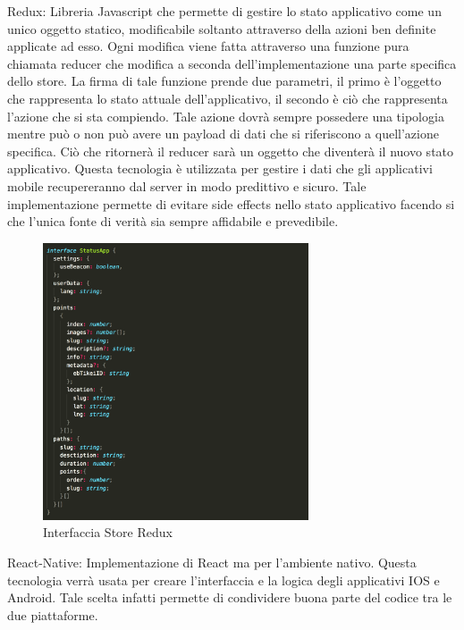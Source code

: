 	Redux: Libreria Javascript che permette di gestire lo stato applicativo come un unico oggetto statico, modificabile soltanto attraverso della azioni ben definite applicate ad esso. Ogni modifica viene fatta attraverso una funzione pura\cite{PureFunction} chiamata reducer che modifica a seconda dell'implementazione una parte specifica dello store. La firma di tale funzione prende due parametri, il primo è l'oggetto che rappresenta lo stato attuale dell'applicativo, il secondo è ciò che rappresenta l'azione che si sta compiendo. Tale azione dovrà sempre possedere una tipologia mentre può o non può avere un payload di dati che si riferiscono a quell'azione specifica. Ciò che ritornerà il reducer sarà un oggetto che diventerà il nuovo stato applicativo. Questa tecnologia è utilizzata per gestire i dati che gli applicativi mobile recupereranno dal server in modo predittivo e sicuro. Tale implementazione permette di evitare side effects\cite{SideEffects} nello stato applicativo facendo si che l'unica fonte di verità sia sempre affidabile e prevedibile. \vspace{5mm}
	
\begin{figure}[h]
\centering
\includegraphics[width=0.7\textwidth]{images/store.png}
\caption{Interfaccia Store Redux}
\end{figure}
\vspace{5mm}
	React-Native: Implementazione di React ma per l’ambiente nativo. Questa tecnologia verrà usata per creare l’interfaccia e la logica degli applicativi IOS e Android. Tale scelta infatti permette di condividere buona parte del codice tra le due piattaforme.\vspace{5mm}

